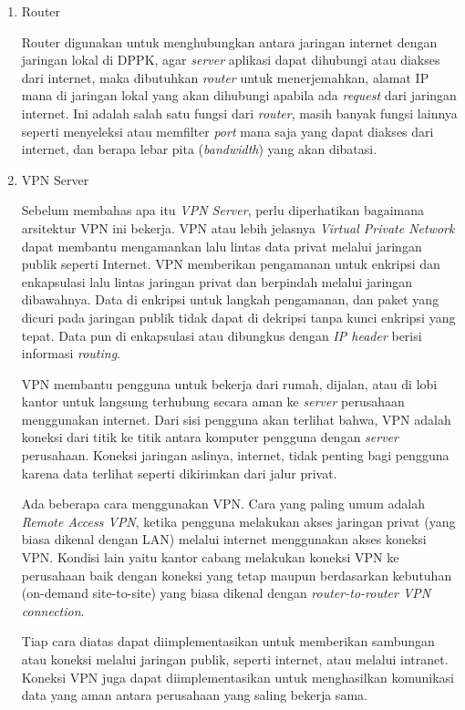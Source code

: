 \documentclass[pdftex,12pt, oneside]{article}
\begin{document}
\begin{enumerate}
\begin{enumerate}
  \item Router
  
  Router digunakan untuk menghubungkan antara jaringan internet dengan jaringan lokal di DPPK, agar \textit{server} aplikasi dapat dihubungi atau diakses dari internet, maka dibutuhkan \textit{router} untuk menerjemahkan, alamat IP mana di jaringan lokal yang akan dihubungi apabila ada \textit{request} dari jaringan internet. Ini adalah salah satu fungsi dari \textit{router}, masih banyak fungsi lainnya seperti menyeleksi atau memfilter \textit{port} mana saja yang dapat diakses dari internet, dan berapa lebar pita (\textit{bandwidth}) yang akan dibatasi. 
  
  \item VPN Server
  
  Sebelum membahas apa itu \textit{VPN Server}, perlu diperhatikan bagaimana arsitektur VPN ini bekerja. VPN atau lebih jelasnya \textit{Virtual Private Network} dapat membantu mengamankan lalu lintas data privat melalui jaringan publik seperti Internet. VPN memberikan pengamanan untuk enkripsi dan enkapsulasi lalu lintas jaringan privat dan berpindah melalui jaringan dibawahnya. Data di enkripsi untuk langkah pengamanan, dan paket yang dicuri pada jaringan publik tidak dapat di dekripsi tanpa kunci enkripsi yang tepat. Data pun di enkapsulasi atau dibungkus dengan \textit{IP header} berisi informasi \textit{routing}.
  
  VPN membantu pengguna untuk bekerja dari rumah, dijalan, atau di lobi kantor untuk langsung terhubung secara aman ke \textit{server} perusahaan menggunakan internet. Dari sisi pengguna akan terlihat bahwa, VPN adalah koneksi dari titik ke titik antara komputer pengguna dengan \textit{server} perusahaan. Koneksi jaringan aslinya, internet, tidak penting bagi pengguna karena data terlihat seperti dikirimkan dari jalur privat.
  
  Ada beberapa cara menggunakan VPN. Cara yang paling umum adalah \textit{Remote Access VPN}, ketika pengguna melakukan akses jaringan privat (yang biasa dikenal dengan LAN) melalui internet menggunakan akses koneksi VPN. Kondisi lain yaitu kantor cabang melakukan koneksi VPN ke perusahaan baik dengan koneksi yang tetap maupun berdasarkan kebutuhan (on-demand site-to-site) yang biasa dikenal dengan \textit{router-to-router VPN connection}.
  
  Tiap cara diatas dapat diimplementasikan untuk memberikan sambungan atau koneksi melalui jaringan publik, seperti internet, atau melalui intranet. Koneksi VPN juga dapat diimplementasikan untuk menghasilkan komunikasi data yang aman antara perusahaan yang saling bekerja sama.
  

\end{enumerate}
\end{enumerate}
\end{document}
